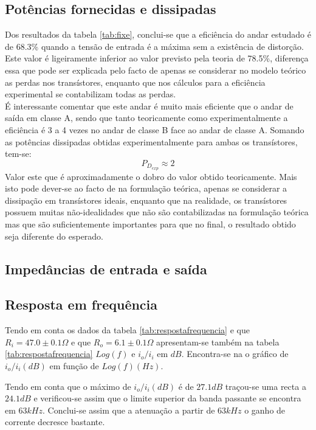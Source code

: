 \documentclass[%
  reprint,
  nofootinbib,
  amsmath,amssymb,
  aps,
  10pt,
  a4paper
]{revtex4-1}
\begin{document}
\subsection{Potências fornecidas e dissipadas}
Dos resultados da tabela \ref{tab:fixe}, conclui-se que a eficiência do andar estudado é de 68.3\% quando a tensão de entrada é a máxima sem a existência de distorção. Este valor é ligeiramente inferior ao valor previsto pela teoria de 78.5\%, diferença essa que pode ser explicada pelo facto de apenas se considerar no modelo teórico as perdas nos transístores, enquanto que nos cálculos para a eficiência experimental se contabilizam todas as perdas.\\
É interessante comentar que este andar é muito mais eficiente que o andar de saída em classe A, sendo que tanto teoricamente como experimentalmente a eficiência é 3 a 4 vezes no andar de classe B face ao andar de classe A.
Somando as potências dissipadas obtidas experimentalmente para ambas os transístores, tem-se:
\begin{equation}
P_{D_{exp}}\approx 2
\end{equation}
Valor este que é aproximadamente o dobro do valor obtido teoricamente. Mais isto pode dever-se ao facto de na formulação teórica, apenas se considerar a dissipação em transístores ideais, enquanto que na realidade, os transístores possuem muitas não-idealidades que não são contabilizadas na formulação teórica mas que são suficientemente importantes para que no final, o resultado obtido seja diferente do esperado.

\subsection{Impedâncias de entrada e saída}
\subsection{Resposta em frequência}
Tendo em conta os dados da tabela \ref{tab:respostafrequencia} e que $R_i=47.0 \pm 0.1 \Omega$ e que $R_o=6.1 \pm 0.1 \Omega$ apresentam-se também na tabela \ref{tab:respostafrequencia} $Log(f)$ e $i_o / i_i $ em $dB$. Encontra-se na   o gráfico de $i_o/i_i (dB)$ em função de $Log(f) (Hz)$.

Tendo em conta que o máximo de  $i_o/i_i (dB)$ é de $27.1 dB$ traçou-se uma recta a $24.1 dB$ e verificou-se assim que o limite superior da banda passante se encontra em $63kHz$. Conclui-se assim que a atenuação a partir de $63kHz$ o ganho de corrente decresce bastante.
\end{document}
